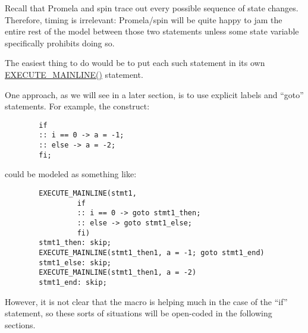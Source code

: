 	Recall that Promela and spin trace out
	every possible sequence of state changes.
	Therefore, timing is irrelevant: Promela/spin will be quite
	happy to jam the entire rest of the model between those two
	statements unless some state variable specifically prohibits
	doing so.


	The easiest thing to do would be to put
	each such statement in its own \url{EXECUTE_MAINLINE()}
	statement.


	One approach, as we will see in a later section,
	is to use explicit labels and ``goto'' statements.
	For example, the construct:

	\vspace{5pt}
	\begin{minipage}[t]{\columnwidth}
	\scriptsize
	\begin{verbatim}
		if
		:: i == 0 -> a = -1;
		:: else -> a = -2;
		fi;
	\end{verbatim}
	\end{minipage}
	\vspace{5pt}

	could be modeled as something like:

	\vspace{5pt}
	\begin{minipage}[t]{\columnwidth}
	\scriptsize
	\begin{verbatim}
		EXECUTE_MAINLINE(stmt1,
				 if
				 :: i == 0 -> goto stmt1_then;
				 :: else -> goto stmt1_else;
				 fi)
		stmt1_then: skip;
		EXECUTE_MAINLINE(stmt1_then1, a = -1; goto stmt1_end)
		stmt1_else: skip;
		EXECUTE_MAINLINE(stmt1_then1, a = -2)
		stmt1_end: skip;
	\end{verbatim}
	\end{minipage}
	\vspace{5pt}

	However, it is not clear that the macro is helping much in the case
	of the ``if'' statement, so these sorts of situations will
	be open-coded in the following sections.


